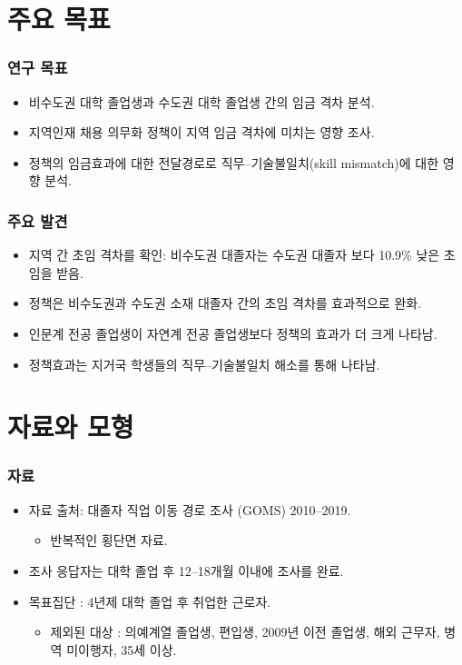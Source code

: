 \documentclass[aspectratio=169,xcolor=dvipsnames,handout]{beamer}
\begin{document}
\section{주요 목표}
\begin{frame}
    \frametitle{연구 목표}
    \begin{itemize}[<+->]
        \item 비수도권 대학 졸업생과 수도권 대학 졸업생 간의 임금 격차 분석.
        \item 지역인재 채용 의무화 정책이 지역 임금 격차에 미치는 영향 조사.
        \item 정책의 임금효과에 대한 전달경로로 직무--기술불일치(skill mismatch)에 대한 영향 분석.
    \end{itemize}
\end{frame}

\begin{frame}
    \frametitle{주요 발견}
    \begin{itemize}[<+->]
        \item 지역 간 초임 격차를 확인: 비수도권 대졸자는 수도권 대졸자 보다 10.9\% 낮은 초임을 받음.
        \item 정책은 비수도권과 수도권 소재 대졸자 간의 초임 격차를 효과적으로 완화.
        \item 인문계 전공 졸업생이 자연계 전공 졸업생보다 정책의 효과가 더 크게 나타남.
        \item 정책효과는 지거국 학생들의 직무--기술불일치 해소를 통해 나타남.
    \end{itemize}
\end{frame}

\section{자료와 모형}%

\begin{frame}
    \frametitle{자료}
    \begin{itemize}[<+->]
        \item 자료 출처: 대졸자 직업 이동 경로 조사 (GOMS) 2010--2019.
        \begin{itemize}
            \item 반복적인 횡단면 자료.
        \end{itemize}
        \item 조사 응답자는 대학 졸업 후 12--18개월 이내에 조사를 완료.
        \item 목표집단 : 4년제 대학 졸업 후 취업한 근로자.
        \begin{itemize}
            \item 제외된 대상 : 의예계열 졸업생, 편입생, 2009년 이전 졸업생, 해외 근무자, 병역 미이행자, 35세 이상.
        \end{itemize}
    \end{itemize}
\end{frame}
\end{document}
